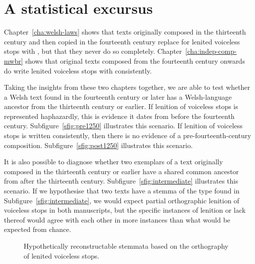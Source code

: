 \section{A statistical excursus}
\label{sec:statistical-excursus}


Chapter~\ref{cha:welsh-laws} shows that texts originally composed in the thirteenth century and then copied in the fourteenth century replace  for lenited voiceless stops with , but that they never do so completely. Chapter~\ref{cha:indep-comp-mwbr} shows that original texts composed from the fourteenth century onwards do write lenited voiceless stops with  consistently.

Taking the insights from these two chapters together, we are able to test whether a Welsh text found in the fourteenth century or later has a Welsh-language ancestor from the thirteenth century or earlier. If lenition of voiceless stops is represented haphazardly, this is evidence it dates from before the fourteenth century. Subfigure~\ref{sfig:pre1250} illustrates this scenario. If lenition of voiceless stops is written consistently, then there is no evidence of a pre-fourteenth-century composition. Subfigure~\ref{sfig:post1250} illustrates this scenario.

It is also possible to diagnose whether two exemplars of a text originally composed in the thirteenth century or earlier have a shared common ancestor from after the thirteenth century. Subfigure~\ref{sfig:intermediate} illustrates this scenario. If we hypothesise that two texts have a stemma of the type found in Subfigure~\ref{sfig:intermediate}, we would expect partial orthographic lenition of voiceless stops in both manuscripts, but the specific instances of lenition or lack thereof would agree with each other in more instances than what would be expected from chance.

\begin{figure}[h]
  \centering
  \subfloat[]{
    \label{sfig:pre1250}
    \begin{forest}
      [μ < 1250
      [X > 1300]
      [Y > 1300]]
    \end{forest}}
  \subfloat[]{
    \label{sfig:post1250}
    \begin{forest}
      [μ > 1300
      [X > 1300]
      [Y > 1300]]
    \end{forest}}
  \caption{Hypothetically reconstructable stemmata based on the orthography of lenited voiceless stops.}
  \label{fig:possiblestemmata}
\end{figure}

